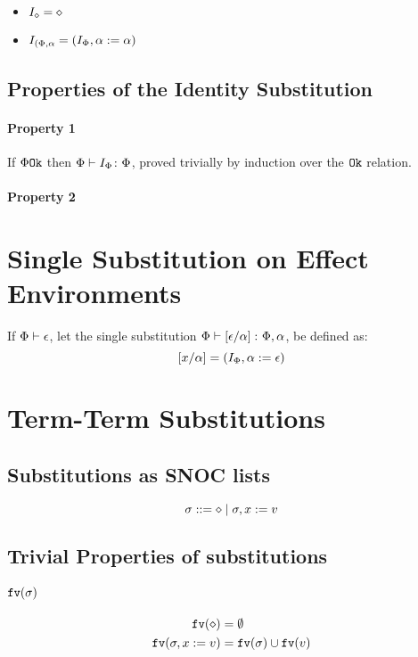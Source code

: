 {\begin{itemize}
\item $I_{\diamond} = \diamond$
\item $I_{(\Phi, \alpha} = (I_{\Phi}, \alpha:= \alpha)$
\end{itemize}

\subsection{Properties of the Identity Substitution}
\paragraph{Property 1}
If $\Phi \texttt{Ok}$ then $\Phi \vdash I_\Phi \colon \Phi$, proved trivially by induction over the $\texttt{Ok}$ relation.

\paragraph{Property 2}
\section{Single Substitution on Effect Environments}

If $\Phi\vdash \epsilon$, let the single substitution $\Phi \vdash \left[\epsilon / \alpha\right] \colon \Phi,\alpha$, be defined as:
\begin{equation}
\left[x / \alpha\right] = (I_{\Phi}, \alpha:= \epsilon)
\end{equation}



\section{Term-Term Substitutions}



\subsection{Substitutions as SNOC lists}

\begin{equation}
   \sigma ::= \diamond \mid \sigma, x := v
\end{equation}

\subsection{Trivial Properties of substitutions}
\paragraph{$\texttt{fv}(\sigma)$}
\begin{align}
    \texttt{fv}(\diamond) &= \emptyset\\
    \texttt{fv}(\sigma, x:= v) &= \texttt{fv}(\sigma)\cup\texttt{fv}(v)
\end{align}
}
